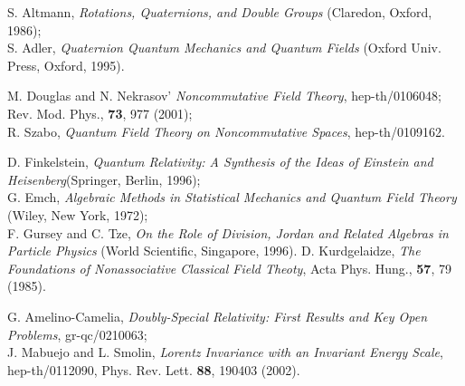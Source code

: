 \documentclass[a4paper,12pt]{article}
\begin{document}
\begin{thebibliography}{99}
 S. Altmann,
            {\it Rotations, Quaternions, and Double Groups}
            (Claredon, Oxford, 1986); \\
            S. Adler,
            {\it Quaternion Quantum Mechanics and Quantum Fields}
            (Oxford Univ. Press, Oxford, 1995).

 M. Douglas and N. Nekrasov'
             {\it Noncommutative Field Theory},
             hep-th/0106048; Rev. Mod. Phys., {\bf 73}, 977 (2001); \\
             R. Szabo,
            {\it Quantum Field Theory on Noncommutative Spaces}, 
            hep-th/0109162.

 D. Finkelstein, 
              {\it Quantum Relativity: A Synthesis of the Ideas of Einstein and 
               Heisenberg}(Springer, Berlin, 1996);\\
               G. Emch, 
              {\it Algebraic Methods in Statistical Mechanics and Quantum Field 
              Theory}
              (Wiley, New York, 1972); \\
               F. Gursey and C. Tze,
               {\it On the Role of Division, Jordan and Related Algebras in 
               Particle Physics} (World Scientific, Singapore, 1996).
 D. Kurdgelaidze,
             {\it The Foundations of Nonassociative Classical Field Theoty},
             Acta Phys. Hung., {\bf 57}, 79 (1985).

 G. Amelino-Camelia,
             {\it Doubly-Special Relativity: First Results and Key Open 
             Problems}, gr-qc/0210063; \\
             J. Mabuejo and L. Smolin,
             {\it Lorentz Invariance with an Invariant Energy Scale},
             hep-th/0112090, Phys. Rev. Lett. {\bf 88}, 190403 (2002).

\end{thebibliography}
\end{document}
